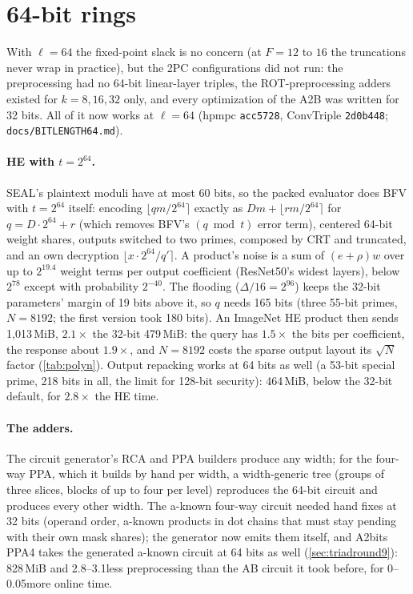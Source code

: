 \section{64-bit rings}\label{sec:bit64}

With $\ell = 64$ the fixed-point slack is no concern (at $F = 12$ to $16$ the truncations never wrap in practice), but
the 2PC configurations did not run: the preprocessing had no 64-bit linear-layer triples, the ROT-preprocessing adders
existed for $k = 8, 16, 32$ only, and every optimization of the A2B was written for 32 bits. All of it now works at
$\ell = 64$ (hpmpc \texttt{acc5728}, ConvTriple \texttt{2d0b448}; \texttt{docs/BITLENGTH64.md}).

\paragraph{HE with $t = 2^{64}$.} SEAL's plaintext moduli have at most 60 bits, so the packed evaluator does BFV with
$t = 2^{64}$ itself: encoding $\lfloor q m / 2^{64} \rceil$ exactly as $D m + \lfloor r m / 2^{64} \rceil$ for
$q = D \cdot 2^{64} + r$ (which removes BFV's $(q \bmod t)$ error term), centered 64-bit weight shares, outputs switched
to two primes, composed by CRT and truncated, and an own decryption $\lfloor x \cdot 2^{64} / q' \rceil$. A product's
noise is a sum of $(e + \rho) w$ over up to $2^{19.4}$ weight terms per output coefficient (ResNet50's widest layers),
below $2^{78}$ except with probability $2^{-40}$. The flooding ($\Delta/16 = 2^{96}$) keeps the 32-bit parameters'
margin of 19 bits above it, so $q$ needs 165 bits (three 55-bit primes, $N = 8192$; the first version took 180 bits).
An ImageNet HE product then sends 1{,}013\,MiB, $2.1\times$ the 32-bit 479\,MiB: the query has $1.5\times$ the bits
per coefficient, the response about $1.9\times$, and $N = 8192$ costs the sparse output layout its $\sqrt{N}$ factor
(\cref{tab:polyn}). Output repacking works at 64 bits as well (a 53-bit special prime, 218 bits in all, the limit for
128-bit security): 464\,MiB, below the 32-bit default, for $2.8\times$ the HE time.

\paragraph{The adders.} The circuit generator's RCA and PPA builders produce any width; for the four-way PPA, which it
builds by hand per width, a width-generic tree (groups of three slices, blocks of up to four per level) reproduces
the 64-bit circuit and produces every other width. The a-known four-way circuit needed hand fixes at 32 bits (operand
order, a-known products in dot chains that must stay pending with their own mask shares); the generator now emits
them itself, and A2bits PPA4 takes the generated a-known circuit at 64 bits as well (\cref{sec:triadround9}): 828\,MiB
and 2.8--3.1\s less preprocessing than the AB circuit it took before, for 0--0.05\s more online time.

